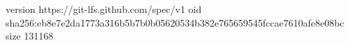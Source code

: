 version https://git-lfs.github.com/spec/v1
oid sha256:eb8e7e2da1773a316b5b7b0b05620534b382e765659545fccae7610afe8e08bc
size 131168
